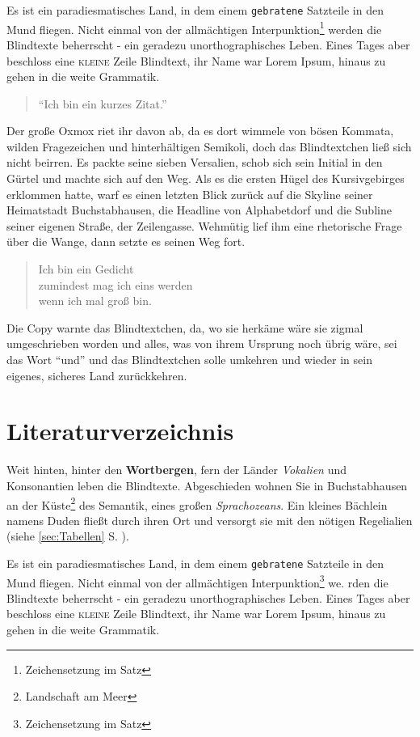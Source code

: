 \documentclass[%
	12pt,%
	a4paper,%
	oneside,%
	listof=totoc,
 	index=totoc,
	bibliography = totoc,
	parskip = half,%
	chapterprefix=false,%
	appendixprefix, %
	headings=small,%
]{scrreprt}
\begin{document}
Es ist ein paradiesmatisches Land, in dem einem \texttt{gebratene} Satzteile in den Mund fliegen. Nicht einmal von der allmächtigen Interpunktion\footnote{Zeichensetzung im Satz} werden die Blindtexte beherrscht - ein geradezu unorthographisches Leben. Eines Tages aber beschloss eine \textsc{kleine} Zeile Blindtext, ihr Name war Lorem Ipsum, hinaus zu gehen in die weite Grammatik. \begin{quote}"`Ich bin ein kurzes Zitat."'\end{quote} Der große Oxmox riet ihr davon ab, da es dort wimmele von bösen Kommata, wilden Fragezeichen und hinterhältigen Semikoli, doch das Blindtextchen ließ sich nicht beirren. Es packte seine sieben Versalien, schob sich sein Initial in den Gürtel und machte sich auf den Weg. Als es die ersten Hügel des Kursivgebirges erklommen hatte, warf es einen letzten Blick zurück auf die Skyline seiner Heimatstadt Buchstabhausen, die Headline von Alphabetdorf und die Subline seiner eigenen Straße, der Zeilengasse. Wehmütig lief ihm eine rhetorische Frage über die Wange, dann setzte es seinen Weg fort.

\begin{verse}
	Ich bin ein Gedicht\\
	zumindest mag ich eins werden\\
	wenn ich mal groß bin.
\end{verse}

Die Copy warnte das Blindtextchen, da, wo sie herkäme wäre sie zigmal umgeschrieben worden und alles, was von ihrem Ursprung noch übrig wäre, sei das Wort "`und"'  und das Blindtextchen solle umkehren und wieder in sein eigenes, sicheres Land zurückkehren.

\chapter{Literaturverzeichnis}
\label{sec:Literaturverzeichnis}

Weit hinten, hinter den \textbf{Wortbergen}, fern der Länder \textit{Vokalien} und Konsonantien leben die Blindtexte. Abgeschieden wohnen Sie in Buchstabhausen an der Küste\footnote{Landschaft am Meer}
des Semantik, eines großen \textsl{Sprachozeans}. Ein kleines Bächlein namens Duden fließt durch ihren Ort und versorgt sie mit den nötigen Regelialien (siehe \ref{sec:Tabellen} S. \pageref{sec:Tabellen}).

Es ist ein paradiesmatisches Land, in dem einem \texttt{gebratene} Satzteile in den Mund fliegen. Nicht einmal von der allmächtigen Interpunktion\footnote{Zeichensetzung im Satz} we. rden die Blindtexte beherrscht - ein geradezu unorthographisches Leben. Eines Tages aber beschloss eine \textsc{kleine} Zeile Blindtext, ihr Name war Lorem Ipsum, hinaus zu gehen in die weite Grammatik.
\end{document}
